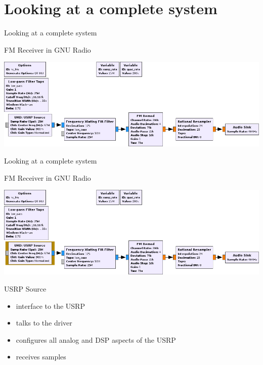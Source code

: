 \documentclass{beamer}
\begin{document}
\section{Looking at a complete system}
\begin{frame}{Looking at a complete system}

  FM Receiver in GNU Radio \bigskip

  {\includegraphics[width=\textwidth]{fg}}



\end{frame}
\begin{frame}{Looking at a complete system}

  FM Receiver in GNU Radio \bigskip


  {\includegraphics[width=\textwidth]{fg_usrp_source}}

  USRP Source

  \begin{itemize}
    \item interface to the USRP
    \item talks to the driver
    \item configures all analog and DSP aspects of the USRP
    \item receives samples
  \end{itemize}


\end{frame}
\end{document}
